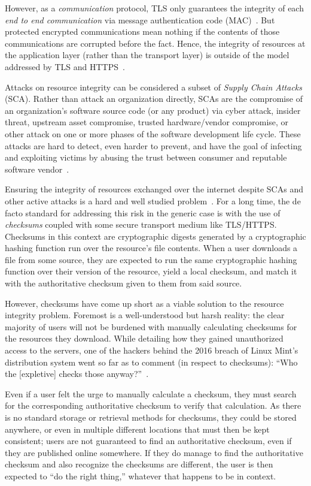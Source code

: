 However, as a \textit{communication} protocol, TLS only guarantees the integrity
of each \textit{end to end communication} via message authentication code
(MAC)~\cite{TLS1.2}. But protected encrypted communications mean nothing if the
contents of those communications are corrupted before the fact. Hence, the
integrity of resources at the application layer (rather than the transport
layer) is outside of the model addressed by TLS and HTTPS~\cite{TLS1.2, HTTPS}.

Attacks on resource integrity can be considered a subset of \emph{Supply Chain
Attacks} (SCA). Rather than attack an organization directly, SCAs are the
compromise of an organization's software source code (or any product) via cyber
attack, insider threat, upstream asset compromise, trusted hardware/vendor
compromise, or other attack on one or more phases of the software development
life cycle. These attacks are hard to detect, even harder to prevent, and have
the goal of infecting and exploiting victims by abusing the trust between
consumer and reputable software vendor~\cite{SCA}.

Ensuring the integrity of resources exchanged over the internet despite SCAs and
other active attacks is a hard and well studied problem~\cite{MD5Header,
HTTP1.1, HTTPS, SRI, LF, OpenPGP1, DNSSEC, PKI}. For a long time, the de facto
standard for addressing this risk in the generic case is with the use of
\textit{checksums} coupled with some secure transport medium like TLS/HTTPS.
Checksums in this context are cryptographic digests generated by a cryptographic
hashing function run over the resource's file contents. When a user downloads a
file from some source, they are expected to run the same cryptographic hashing
function over their version of the resource, yield a local checksum, and match
it with the authoritative checksum given to them from said source.

However, checksums have come up short as a viable solution to the resource
integrity problem. Foremost is a well-understood but harsh reality: the clear
majority of users will not be burdened with manually calculating checksums for
the resources they download. While detailing how they gained unauthorized access
to the servers, one of the hackers behind the 2016 breach of Linux Mint's
distribution system went so far as to comment (in respect to checksums): ``Who
the [expletive] checks those anyway?''~\cite{SCA-MINT3}.

Even if a user felt the urge to manually calculate a checksum, they must search
for the corresponding authoritative checksum to verify that calculation. As
there is no standard storage or retrieval methods for checksums, they could be
stored anywhere, or even in multiple different locations that must then be kept
consistent; users are not guaranteed to find an authoritative checksum, even if
they are published online somewhere. If they do manage to find the authoritative
checksum and also recognize the checksums are different, the user is then
expected to ``do the right thing,'' whatever that happens to be in context.

